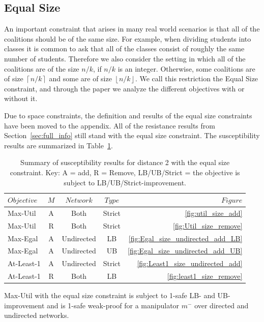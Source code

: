 \clearpage
\subsection*{Equal Size}
An important constraint that arises in many real world scenarios is that all of the coalitions should be of the same size. For example, when dividing students into classes it is common to ask that all of the classes consist of roughly the same number of students.
Therefore we also consider the setting in which all of the coalitions are of the size $n/k$, if $n/k$ is an integer. Otherwise, some coalitions are of size $\left \lceil{n/k}\right \rceil$ and some are of size $\left \lfloor{n/k}\right \rfloor$. We call this restriction the Equal Size constraint, and through the paper we analyze the different objectives with or without it.

Due to space constraints, the definition and results of the equal size constraints have been moved to the appendix. All of the resistance results from Section~\ref{sec:full_info} still stand with the equal size constraint. The susceptibility results are summarized in Table~\ref{tbl:distnce2_equalsize}.




\begin{table}[htp]

\begin{tabular}{@{}lcccr@{}}\toprule 
$Objective$ & $M$ & $Network$ & $Type$ & $Figure$\\\midrule
Max-Util & A & Both & Strict & \ref{fig:util_size_add}\\
Max-Util & R & Both & Strict & \ref{fig:Util_size_remove}\\
Max-Egal & A & Undirected & LB & \ref{fig:Egal_size_undirected_add_LB}\\
Max-Egal & A & Undirected & UB & \ref{fig:Egal_size_undirected_add_UB}\\
At-Least-1 & A & Undirected & Strict & \ref{fig:Least1_size_undirected_add}\\
At-Least-1 & R & Both & LB & \ref{fig:least1_size_remove}\\
\bottomrule
\end{tabular}
\caption{Summary of susceptibility results for distance 2 with the equal size constraint.
Key: A = add, R = Remove, LB/UB/Strict = the objective is subject to LB/UB/Strict-improvement.
}
\label{tbl:distnce2_equalsize}
\end{table}

\begin{proposition}
\label{thm:util_distance1}
Max-Util with the equal size constraint is subject to 1-safe LB- and UB-improvement and is 1-safe weak-proof for a manipulator $m^-$ over directed and undirected networks. 
\end{proposition}

